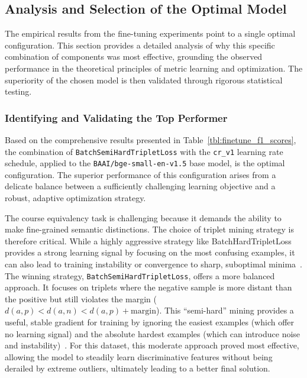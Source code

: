 \subsection{Analysis and Selection of the Optimal Model}
The empirical results from the fine-tuning experiments point to a single optimal configuration. This section provides a detailed analysis of why this specific combination of components was most effective, grounding the observed performance in the theoretical principles of metric learning and optimization. The superiority of the chosen model is then validated through rigorous statistical testing.

\subsubsection{Identifying and Validating the Top Performer}
Based on the comprehensive results presented in Table~\ref{tbl:finetune_f1_scores}, the combination of \verb|BatchSemiHardTripletLoss| with the \verb|cr_v1| learning rate schedule, applied to the \verb|BAAI/bge-small-en-v1.5| base model, is the optimal configuration. The superior performance of this configuration arises from a delicate balance between a sufficiently challenging learning objective and a robust, adaptive optimization strategy.{\setlength{\emergencystretch}{5em}\par}

The course equivalency task is challenging because it demands the ability to make fine-grained semantic distinctions. The choice of triplet mining strategy is therefore critical. While a highly aggressive strategy like BatchHardTripletLoss provides a strong learning signal by focusing on the most confusing examples, it can also lead to training instability or convergence to sharp, suboptimal minima~\cite{hermans2017defensetripletlossperson,Schroff_2015_CVPR}. The winning strategy, \verb|BatchSemiHardTripletLoss|, offers a more balanced approach. It focuses on triplets where the negative sample is more distant than the positive but still violates the margin (\(d(a,p) < d(a,n) < d(a,p) + \mathrm{margin}\)). This ``semi-hard'' mining provides a useful, stable gradient for training by ignoring the easiest examples (which offer no learning signal) and the absolute hardest examples (which can introduce noise and instability)~\cite{Schroff_2015_CVPR}. For this dataset, this moderate approach proved most effective, allowing the model to steadily learn discriminative features without being derailed by extreme outliers, ultimately leading to a better final solution.{\setlength{\emergencystretch}{5em}\par}

